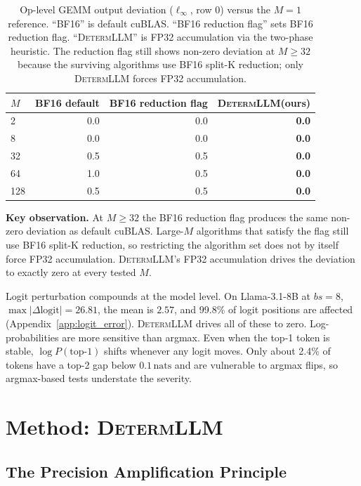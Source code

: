 \documentclass{article}
\newcommand{\dllm}{\textsc{DetermLLM}\xspace}
\newcommand{\nats}{\,\text{nats}\xspace}
\newcommand{\bfflag}{BF16 reduction flag\xspace}
\begin{document}
\begin{table}[h]
\centering
\caption{Op-level GEMM output deviation ($\ell_\infty$, row 0) versus the $M\!=\!1$
  reference. ``BF16'' is default cuBLAS. ``BF16 reduction flag'' sets \bfflag. ``\dllm''
  is FP32 accumulation via the two-phase heuristic. The reduction flag still shows
  non-zero deviation at $M\!\ge\!32$ because the surviving algorithms use BF16
  split-K reduction; only \dllm forces FP32 accumulation.}
\label{tab:gemm_error}
\begin{tabular}{lrrr}
\toprule
$M$ & BF16 default & BF16 reduction flag & \dllm (ours) \\
\midrule
2   & 0.0    & 0.0    & \textbf{0.0} \\
8   & 0.0    & 0.0    & \textbf{0.0} \\
32  & 0.5    & 0.5    & \textbf{0.0} \\
64  & 1.0    & 0.5    & \textbf{0.0} \\
128 & 0.5    & 0.5    & \textbf{0.0} \\
\bottomrule
\end{tabular}
\end{table}

\textbf{Key observation.}
At $M\!\ge\!32$ the BF16 reduction flag produces the same non-zero deviation as
default cuBLAS. Large-$M$ algorithms that satisfy the flag still use BF16 split-K
reduction, so restricting the algorithm set does not by itself force FP32
accumulation. \dllm's FP32 accumulation drives the deviation to exactly zero at
every tested $M$.

Logit perturbation compounds at the model level. On Llama-3.1-8B at $bs\!=\!8$,
$\max|\Delta\text{logit}|\!=\!26.81$, the mean is $2.57$, and 99.8\% of logit
positions are affected (Appendix~\ref{app:logit_error}). \dllm drives all of these
to zero. Log-probabilities are more sensitive than argmax. Even when the top-1
token is stable, $\log P(\text{top-1})$ shifts whenever any logit moves. Only
about 2.4\% of tokens have a top-2 gap below $0.1\nats$ and are vulnerable to
argmax flips, so argmax-based tests understate the severity.

\section{Method: \dllm}
\label{sec:method}

\subsection{The Precision Amplification Principle}
\label{sec:theorem}
\end{document}
